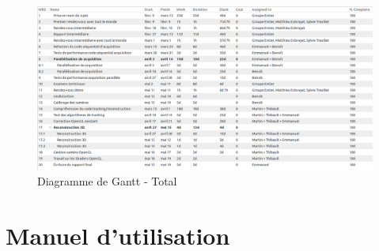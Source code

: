 \documentclass{article}
\begin{document}

\newpage

\begin{figure}[!h]
\centering
\includegraphics[width=\textwidth]{Modules/Picture/tableau_gantt_final}
\caption{Diagramme de Gantt - Total}
\end{figure}

\clearpage

\newpage



\section{Manuel d'utilisation}



\newpage


\nocite{*}


 
\end{document}

